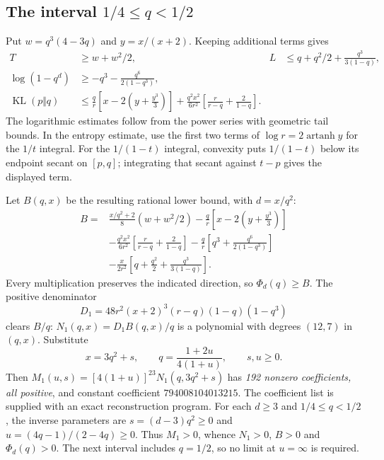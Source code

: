 \documentclass[11pt]{article}
\begin{document}
\subsection{The interval \texorpdfstring{$1/4\le q<1/2$}{1/4 <= q < 1/2}}
Put $w=q^3(4-3q)$ and $y=x/(x+2)$. Keeping additional terms gives
\begin{align*}
 T&\ge w+w^2/2,&
 L&\le q+q^2/2+\frac{q^3}{3(1-q)},\\
 \log(1-q^d)&\ge-q^3-\frac{q^6}{2(1-q^3)},\\
 \operatorname{KL}(p\Vert q)&\le
 \frac qr\left[x-2\left(y+\frac{y^3}{3}\right)\right]
 +\frac{q^2x^2}{6r^2}\left[\frac r{r-q}+\frac2{1-q}\right].
\end{align*}
The logarithmic estimates follow from the power series with geometric tail
bounds. In the entropy estimate, use the first two terms of
$\log r=2\operatorname{artanh}y$ for the $1/t$ integral. For the
$1/(1-t)$ integral, convexity puts $1/(1-t)$ below its endpoint secant
on $[p,q]$; integrating that secant against $t-p$ gives the displayed term.

Let $B(q,x)$ be the resulting rational lower bound, with $d=x/q^2$:
\begin{align*}
 B={}&\frac{x/q^2+2}{8}(w+w^2/2)
 -\frac qr\left[x-2\left(y+\frac{y^3}{3}\right)\right]\\
 &-\frac{q^2x^2}{6r^2}\left[\frac r{r-q}+\frac2{1-q}\right]
 -\frac qr\left[q^3+\frac{q^6}{2(1-q^3)}\right]\\
 &-\frac{x}{2r^2}\left[q+\frac{q^2}{2}+\frac{q^3}{3(1-q)}\right].
\end{align*}
Every multiplication preserves the indicated direction, so $\Phi_d(q)\ge B$.
The positive denominator
\[
 D_1=48r^2(x+2)^3(r-q)(1-q)(1-q^3)
\]
clears $B/q$: $N_1(q,x)=D_1B(q,x)/q$ is a polynomial with degrees
$(12,7)$ in $(q,x)$. Substitute
\[
 x=3q^2+s,\qquad q=\frac{1+2u}{4(1+u)},\qquad s,u\ge0.
\]
Then $M_1(u,s)=[4(1+u)]^{23}N_1(q,3q^2+s)$ has
\emph{192 nonzero coefficients, all positive}, and constant coefficient
$794008104013215$. The coefficient list is supplied with an exact
reconstruction program. For each $d\ge3$ and $1/4\le q<1/2$, the inverse
parameters are $s=(d-3)q^2\ge0$ and $u=(4q-1)/(2-4q)\ge0$.
Thus $M_1>0$, whence $N_1>0$, $B>0$ and $\Phi_d(q)>0$.
The next interval includes $q=1/2$, so no limit at $u=\infty$ is required.
\end{document}
